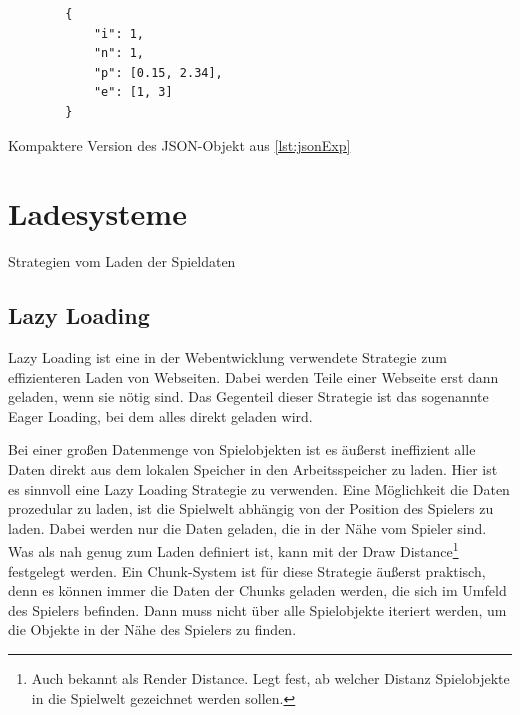 \begin{listing}[htp]
    \begin{verbatim}
        {
            "i": 1,
            "n": 1,
            "p": [0.15, 2.34],
            "e": [1, 3]
        }
    \end{verbatim}
    \caption{Kompaktere Version des JSON-Objekt aus \ref{lst:jsonExp}}
    \label{lst:shorterJson}
\end{listing}




\section{Ladesysteme}\label{sect:ladesysteme}
Strategien vom Laden der Spieldaten


\subsection{Lazy Loading} \label{ssect:lazyloading}
Lazy Loading ist eine in der Webentwicklung verwendete Strategie zum effizienteren Laden von Webseiten. Dabei werden Teile einer Webseite erst dann geladen, wenn sie nötig sind. Das Gegenteil dieser Strategie ist das sogenannte Eager Loading, bei dem alles direkt geladen wird. 
\cite{cloudflareLazyLoad}

Bei einer großen Datenmenge von Spielobjekten ist es äußerst ineffizient alle Daten direkt aus dem lokalen Speicher in den Arbeitsspeicher zu laden. Hier ist es sinnvoll eine Lazy Loading Strategie zu verwenden. Eine Möglichkeit die Daten prozedular zu laden, ist die Spielwelt abhängig von der Position des Spielers zu laden. Dabei werden nur die Daten geladen, die in der Nähe vom Spieler sind. Was als nah genug zum Laden definiert ist, kann mit der Draw Distance\footnote{Auch bekannt als Render Distance. Legt fest, ab welcher Distanz Spielobjekte in die Spielwelt gezeichnet werden sollen.\cite{nerdburglarsWhatDraw}} festgelegt werden. Ein Chunk-System ist für diese Strategie äußerst praktisch, denn es können immer die Daten der Chunks geladen werden, die sich im Umfeld des Spielers befinden. Dann muss nicht über alle Spielobjekte iteriert werden, um die Objekte in der Nähe des Spielers zu finden.




